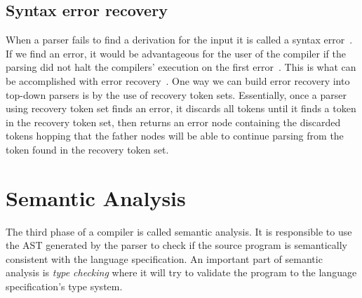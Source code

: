 \documentclass[
  oneside,
  english,
  coorientadorbanca,
  noabntexcite
]{ufsc-thesis-rn46-2019}
\def\bnfdef{::=}
\newcommand{\code}[1]{\texttt{#1}}
\newcommand{\bnfvar}[1]{\ \bnfvars{#1}}
\newcommand{\bnfvars}[1]{\code{#1}}
\newcommand{\bnfter}[1]{\ \bnfters{#1}}
\newcommand{\bnfters}[1]{\textrm{`}\code{#1}\textrm{'}}
\newcommand{\bnfprod}[2]{\bnfvars{#1} &\ &\bnfdef& #2}
\newcommand{\bnfmore}[1]{ && \mid{} & #1}
\begin{document}
\subsection{Syntax error recovery}

When a parser fails to find a derivation for the input it is called a syntax error~\cite{appel2003modern}.
If we find an error, it would be advantageous for the user of the compiler if the parsing did not halt the compilers' execution on the first error~\cite{appel2003modern}.
This is what can be accomplished with error recovery~\cite{appel2003modern}.
One way we can build error recovery into top-down parsers is by the use of recovery token sets.
Essentially, once a parser using recovery token set finds an error, it discards all tokens until it finds a token in the recovery token set, then returns an error node containing the discarded tokens hopping that the father nodes will be able to continue parsing from the token found in the recovery token set.

\section{Semantic Analysis}\label{chapter:background:sec:semantic}

The third phase of a compiler is called semantic analysis.
It is responsible to use the AST generated by the parser to check if the source program is semantically consistent with the language specification.
An important part of semantic analysis is \textit{type checking} where it will try to validate the program to the language specification's type system.

\end{document}
